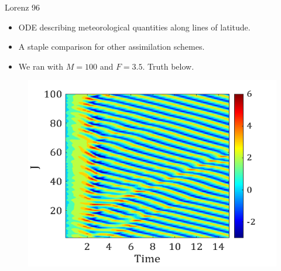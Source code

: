 \documentclass[aspectratio=169]{beamer}
\begin{document}
\begin{frame}{Lorenz 96}
\vfill
\begin{itemize}
    \item ODE describing meteorological quantities along lines of latitude.
    \item A staple comparison for other assimilation schemes.
    \item We ran with $M=100$ and $F=3.5$. Truth below. 
\end{itemize}
\begin{figure}[H]
    \centering
    \includegraphics[width=.5\textwidth]{figures/L96_F3.5N100.png}
\end{figure}
\vfill
\end{frame}
\end{document}

